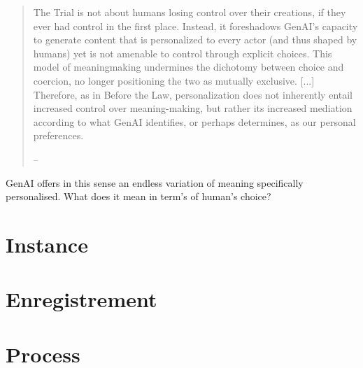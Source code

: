 \begin{quote}
	The Trial is not about humans losing control over their creations, if they ever had control in the first place. Instead, it foreshadows GenAI’s capacity to generate content that is personalized to every actor (and thus shaped by humans) yet is not amenable to control through explicit choices. This model of meaningmaking undermines the dichotomy between choice and coercion, no longer positioning the two as mutually exclusive. [...] Therefore, as in Before the Law, personalization does not inherently entail increased control over meaning-making, but rather its increased mediation according to what GenAI identifies, or perhaps determines, as our personal preferences.

	-- \textcite[974]{dishon2024}
\end{quote}

GenAI offers in this sense an endless variation of meaning specifically
personalised. What does it mean in term's of human's choice?
%

\section{Instance}\label{sec:Instance} %

\section{Enregistrement \parencite[4]{deleuze1983} }\label{sec:Enregistrement \parencite[4]{deleuze1983} } %
%

\section{Process}\label{sec:Process} %




